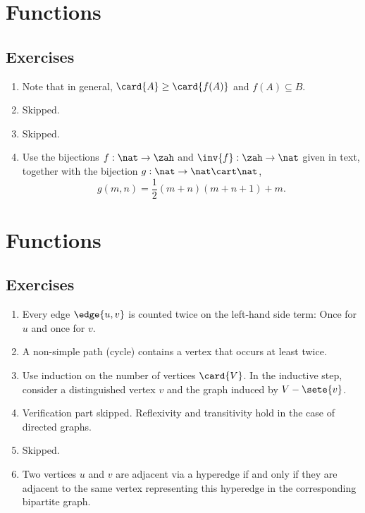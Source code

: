 \section{Functions}
\subsection*{Exercises}
\begin{enumerate}[\thesection-1]
%
\item Note that in general, $\card{A} \geq \card{f(A)}$ and $f(A) \subseteq B$.
%
\item Skipped.
%
\item Skipped.
%
\item Use the bijections $f : \nat \to \zah$ and $\inv{f} : \zah \to \nat$ given in text, together with the bijection $g : \nat \to \nat \cart \nat$,
\[
g(m, n) = \frac{1}{2}(m + n)(m + n + 1) + m.
\]
%
\end{enumerate}

\section{Functions}
\subsection*{Exercises}
\begin{enumerate}[\thesection-1]
%
\item Every edge $\edge{u, v}$ is counted twice on the left-hand side term: Once for $u$ and once for $v$.
%
\item A non-simple path (cycle) contains a vertex that occurs at least twice.
%
\item Use induction on the number of vertices $\card{V}$. In the inductive step, consider a distinguished vertex $v$ and the graph induced by $V - \sete{v}$.
%
\item Verification part skipped. Reflexivity and transitivity hold in the case of directed graphs.
%
\item Skipped.
%
\item Two vertices $u$ and $v$ are adjacent via a hyperedge if and only if they are adjacent to the same vertex representing this hyperedge in the corresponding bipartite graph.
%
\end{enumerate}

